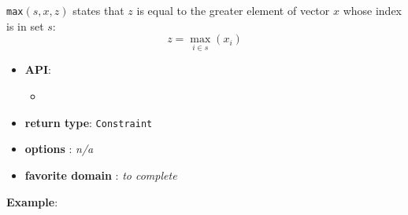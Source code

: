 \begin{notedef}
\texttt{max}$(s,x,z)$ states that $z$ is equal to the greater element of vector $x$ whose index is in set $s$:
$$z = \max_{i\in s}( x_i )$$
  \end{notedef}

\begin{itemize}
	\item \textbf{API}:
	\begin{itemize}
		\item {}
	\end{itemize}
	\item \textbf{return type}: \texttt{Constraint}
	\item \textbf{options} : \emph{n/a}
	\item \textbf{favorite domain} : \emph{to complete}
\end{itemize}

\textbf{Example}:

